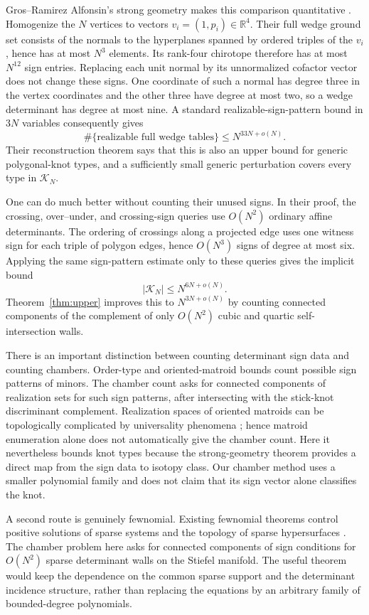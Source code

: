 \documentclass[11pt]{article}
\theoremstyle{remark}
\theoremstyle{plain}
\newcommand{\R}{\mathbb{R}}
\newcommand{\Kcal}{\mathcal{K}}
\begin{document}
Gros--Ramirez Alfonsin's strong geometry makes this comparison quantitative
\cite{GrosRamirez}.  Homogenize the \(N\) vertices to vectors
\(v_i=(1,p_i)\in\R^4\).  Their full wedge ground set consists of the normals to
the hyperplanes spanned by ordered triples of the \(v_i\), hence has at most
\(N^3\) elements.  Its rank-four chirotope therefore has at most \(N^{12}\)
sign entries.  Replacing each unit normal by its unnormalized cofactor vector
does not change these signs.  One coordinate of such a normal has degree three
in the vertex coordinates and the other three have degree at most two, so a
wedge determinant has degree at most nine.  A standard realizable-sign-pattern
bound \cite{PollackRoy} in \(3N\) variables consequently gives
\[
    \#\{\text{realizable full wedge tables}\}
       \le N^{33N+o(N)}.
\]
Their reconstruction theorem says that this is also an upper bound for generic
polygonal-knot types, and a sufficiently small generic perturbation covers
every type in \(\Kcal_N\).

One can do much better without counting their unused signs.  In their proof,
the crossing, over--under, and crossing-sign queries use \(O(N^2)\) ordinary
affine determinants.  The ordering of crossings along a projected edge uses
one witness sign for each triple of polygon edges, hence \(O(N^3)\) signs of
degree at most six.  Applying the same sign-pattern estimate only to these
queries gives the implicit bound
\[
    |\Kcal_N|\le N^{6N+o(N)}.
\]
Theorem~\ref{thm:upper} improves this to \(N^{3N+o(N)}\) by counting connected
components of the complement of only \(O(N^2)\) cubic and quartic
self-intersection walls.

There is an important distinction between counting determinant sign data and
counting chambers.  Order-type and oriented-matroid bounds count possible sign
patterns of minors.  The chamber count asks for connected components of
realization sets for such sign patterns, after intersecting with the stick-knot
discriminant complement.  Realization spaces of oriented matroids can be
topologically complicated by universality phenomena \cite{Mnev,RichterGebert};
hence matroid enumeration alone does not automatically give the chamber count.
Here it nevertheless bounds knot types because the strong-geometry theorem
provides a direct map from the sign data to isotopy class.  Our chamber method
uses a smaller polynomial family and does not claim that its sign vector alone
classifies the knot.

A second route is genuinely fewnomial.  Existing fewnomial theorems control
positive solutions of sparse systems and the topology of sparse hypersurfaces
\cite{KhovanskiiFewnomials,BihanSottileFewnomial,BihanRojasSottile,
BihanSottileBetti}.  The chamber problem here asks for connected components of
sign conditions for \(O(N^2)\) sparse determinant walls on the Stiefel manifold.
The useful theorem would keep the dependence on the common sparse support and
the determinant incidence structure, rather than replacing the equations by an
arbitrary family of bounded-degree polynomials.
\end{document}
